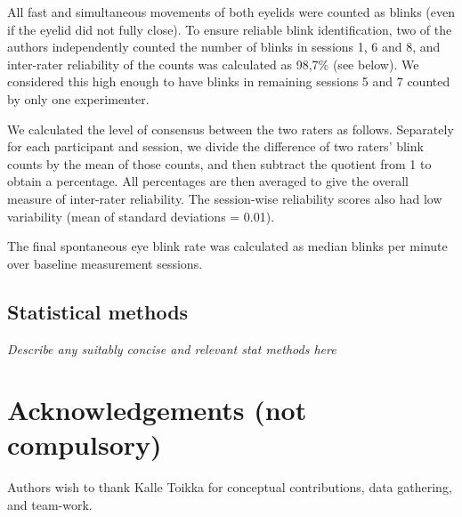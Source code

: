 \documentclass[fleqn,10pt]{wlscirep}
\begin{document}
All fast and simultaneous movements of both eyelids were counted as blinks (even if the eyelid did not fully close). To ensure reliable blink identification, two of the authors independently counted the number of blinks in sessions 1, 6 and 8, and inter-rater reliability of the counts was calculated as 98,7\% (see below). We considered this high enough to have blinks in remaining sessions 5 and 7 counted by only one experimenter.

We calculated the level of consensus between the two raters as follows. Separately for each participant and session, we divide the difference of two raters' blink counts by the mean of those counts, and then subtract the quotient from 1 to obtain a percentage. All percentages are then averaged to give the overall measure of inter-rater reliability. The session-wise reliability scores also had low variability (mean of standard deviations = 0.01).

The final spontaneous eye blink rate was calculated as median blinks per minute over baseline measurement sessions.


\subsection*{Statistical methods}
\textit{Describe any suitably concise and relevant stat methods here}







\section*{Acknowledgements (not compulsory)}
Authors wish to thank Kalle Toikka for conceptual contributions, data gathering, and team-work.
\end{document}
